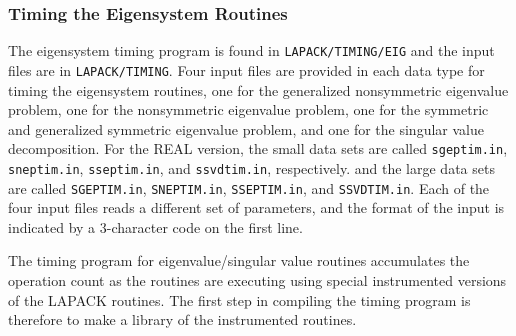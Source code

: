\subsubsection{Timing the Eigensystem Routines}\label{timeeig}

\dent
The eigensystem timing program is found in {\tt LAPACK/TIMING/EIG}
and the input files are in {\tt LAPACK/TIMING}.
Four input files are provided in each data type for timing the
eigensystem routines,
one for the generalized nonsymmetric eigenvalue problem, 
one for the nonsymmetric eigenvalue problem, 
one for the symmetric and generalized symmetric eigenvalue problem,
and one for the singular value decomposition.
For the REAL version, the small data sets are called {\tt sgeptim.in},
{\tt sneptim.in}, {\tt sseptim.in}, and {\tt ssvdtim.in}, respectively.
and the large data sets are called {\tt SGEPTIM.in}, {\tt SNEPTIM.in},
{\tt SSEPTIM.in}, and {\tt SSVDTIM.in}.
Each of the four input files reads a different set of parameters,
and the format of the input is indicated by a 3-character code
on the first line.

The timing program for eigenvalue/singular value routines accumulates
the operation count as the routines are executing using special
instrumented versions of the LAPACK routines.  The first step in
compiling the timing program is therefore to make a library of the
instrumented routines.

